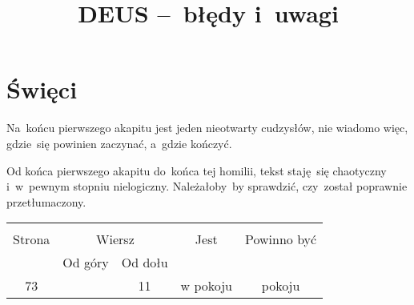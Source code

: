 \documentclass[a4paper,11pt]{article}
\title{DEUS --~błędy i~uwagi}
\begin{document}



\maketitle  %



\section{Święci}

\vspace{\spaceTwo}






\start {} Na~końcu pierwszego akapitu jest jeden nieotwarty
cudzysłów, nie wiadomo więc, gdzie~się powinien zaczynać, a~gdzie
kończyć.

\vspace{\spaceFour}


\start {} Od końca pierwszego akapitu do~końca tej homilii,
tekst staję~się chaotyczny i~w~pewnym stopniu nielogiczny.
Należałoby~by sprawdzić, czy~został poprawnie przetłumaczony.


\begin{center}
  \begin{tabular}{|c|c|c|c|c|}
    \hline
    & \multicolumn{2}{c|}{} & & \\
    Strona & \multicolumn{2}{c|}{Wiersz} & Jest
                              & Powinno być \\ \cline{2-3}
    & Od góry & Od dołu & & \\
    \hline
    73 & & 11 & w pokoju & pokoju \\
    \hline
  \end{tabular}
\end{center}

\vspace{\spaceTwo}
\end{document}
